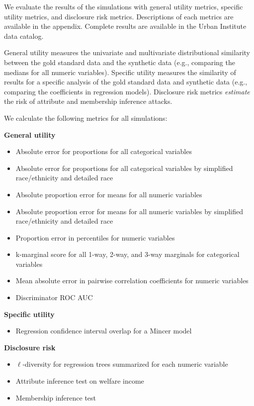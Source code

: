 \documentclass[
]{urban-formatting}
\providecommand{\tightlist}{%
  \setlength{\itemsep}{0pt}\setlength{\parskip}{0pt}}\usepackage{longtable,booktabs,array}
\begin{document}
We evaluate the results of the simulations with general utility metrics,
specific utility metrics, and disclosure risk metrics. Descriptions of
each metrics are available in the appendix. Complete results are
available in the Urban Institute data catalog.

General utility measures the univariate and multivariate distributional
similarity between the gold standard data and the synthetic data (e.g.,
comparing the medians for all numeric variables). Specific utility
measures the similarity of results for a specific analysis of the gold
standard data and synthetic data (e.g., comparing the coefficients in
regression models). Disclosure risk metrics \emph{estimate} the risk of
attribute and membership inference attacks.

We calculate the following metrics for all simulations:

\textbf{General utility}

\begin{itemize}
\tightlist
\item
  Absolute error for proportions for all categorical variables
\item
  Absolute error for proportions for all categorical variables by
  simplified race/ethnicity and detailed race
\item
  Absolute proportion error for means for all numeric variables
\item
  Absolute proportion error for means for all numeric variables by
  simplified race/ethnicity and detailed race
\item
  Proportion error in percentiles for numeric variables
\item
  k-marginal score for all 1-way, 2-way, and 3-way marginals for
  categorical variables
\item
  Mean absolute error in pairwise correlation coefficients for numeric
  variables
\item
  Discriminator ROC AUC
\end{itemize}

\textbf{Specific utility}

\begin{itemize}
\tightlist
\item
  Regression confidence interval overlap for a Mincer model
\end{itemize}

\textbf{Disclosure risk}

\begin{itemize}
\tightlist
\item
  \(\ell\)-diversity for regression trees summarized for each numeric
  variable
\item
  Attribute inference test on welfare income
\item
  Membership inference test
\end{itemize}
\end{document}
